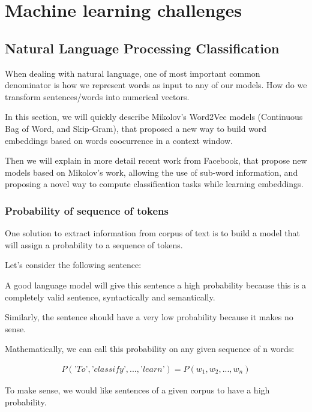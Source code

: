 \chapter{Machine learning challenges}
\label{cha:results}


\section{Natural Language Processing Classification}

When dealing with natural language, one of most important common denominator is how we represent words as input to any of our models. How do we transform sentences/words into numerical vectors.

In this section, we will quickly describe Mikolov's Word2Vec models (Continuous Bag of Word, and Skip-Gram), that proposed a new way to build word embeddings based on words coocurrence in a context window.

Then we will explain in more detail recent work from Facebook, that propose new models based on Mikolov's work, allowing the use of sub-word information, and proposing a novel way to compute classification tasks while learning embeddings.

\subsection{Probability of sequence of tokens}

One solution to extract information from corpus of text is to build a model that will assign a probability to a sequence of tokens. 

Let's consider the following sentence: 

A good language model will give this sentence a high probability because this is a completely valid sentence, syntactically and semantically.

Similarly, the sentence  should have a very low probability because it makes no sense. 

Mathematically, we can call this probability on any given sequence of n words:

\begin{align}
	P(\textit{'To'},\textit{'classify'}, ..., \textit{'learn'}) = P(w_1, w_2, ..., w_n)
\end{align}

To make sense, we would like sentences of a given corpus to have a high probability.

